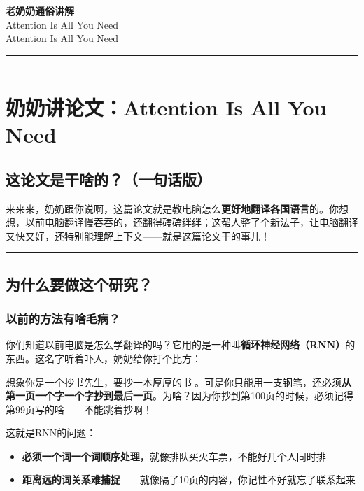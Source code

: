 \documentclass[11pt,a4paper]{article}
\begin{document}
\begin{center}
{\LARGE\bfseries 老奶奶通俗讲解}\\[0.5em]
{\large Attention Is All You Need}\\[0.3em]
{\normalsize Attention Is All You Need}
\end{center}

\vspace{1em}
\noindent\rule{\textwidth}{0.4pt}
\tableofcontents
\noindent\rule{\textwidth}{0.4pt}
\vspace{1em}

\section*{奶奶讲论文：Attention Is All You Need}

\subsection*{这论文是干啥的？（一句话版）}

来来来，奶奶跟你说啊，这篇论文就是教电脑怎么\textbf{更好地翻译各国语言}的。你想想，以前电脑翻译慢吞吞的，还翻得磕磕绊绊；这帮人整了个新法子，让电脑翻译又快又好，还特别能理解上下文——就是这篇论文干的事儿！

\vspace{0.5em}\noindent\rule{\textwidth}{0.4pt}\vspace{0.5em}

\subsection*{为什么要做这个研究？}

\subsubsection*{以前的方法有啥毛病？}

你们知道以前电脑是怎么学翻译的吗？它用的是一种叫\textbf{循环神经网络（RNN）}的东西。这名字听着吓人，奶奶给你打个比方：

想象你是一个抄书先生，要抄一本厚厚的书📖。可是你只能用一支钢笔，还必须\textbf{从第一页一个字一个字抄到最后一页}。为啥？因为你抄到第100页的时候，必须记得第99页写的啥——不能跳着抄啊！

这就是RNN的问题：

\begin{itemize}
  \item \textbf{必须一个词一个词顺序处理}，就像排队买火车票，不能好几个人同时排
  \item \textbf{距离远的词关系难捕捉}——就像隔了10页的内容，你记性不好就忘了联系起来
\end{itemize}
\end{document}
